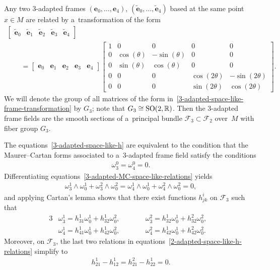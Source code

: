 \documentclass[10pt,a4paper]{amsart}
\numberwithin{equation}{section}
\theoremstyle{definition}
\begin{document}
Any two 3-adapted frames $(\mathbf{e}_0, \ldots, \mathbf{e}_4)$, $(\tilde{\mathbf{e}}_0, \ldots, \tilde{\mathbf{e}}_4)$
based at the same point $x \in M$ are related by a~transformation of the form
\begin{gather}
\begin{bmatrix}
\tilde{\mathbf{e}}_0 & \tilde{\mathbf{e}}_1 & \tilde{\mathbf{e}}_2 & \tilde{\mathbf{e}}_3 & \tilde{\mathbf{e}}_4
\end{bmatrix}
\nonumber
\\
\qquad{}
=
\begin{bmatrix}
\mathbf{e}_0 & \mathbf{e}_1 & \mathbf{e}_2 & \mathbf{e}_3 & \mathbf{e}_4
\end{bmatrix}
\begin{bmatrix}
1 & 0 & 0 & 0 & 0
\\
0 & \cos(\theta) & -\sin(\theta) & 0 & 0
\\
0 & \sin(\theta) & \cos(\theta) & 0 & 0
\\
0 & 0 & 0 & \cos(2\theta) & -\sin(2\theta)
\\
0 & 0 & 0 & \sin(2\theta) & \cos(2\theta)
\end{bmatrix}.
\label{3-adapted-space-like-frame-transformation}
\end{gather}
We will denote the group of all matrices of the form in~\eqref{3-adapted-space-like-frame-transformation} by $G_3$; note
that $G_3 \cong {\rm SO}(2,\mathbb{R})$.
Then the 3-adapted frame f\/ields are the smooth sections of a~principal bundle $\mathcal{F}_3 \subset \mathcal{F}_2$
over~$M$ with f\/iber group $G_3$.

The equations~\eqref{3-adapted-space-like-h} are equivalent to the condition that the Maurer--Cartan forms associated to
a~3-adapted frame f\/ield satisfy the conditions
\begin{gather}
\omega^0_3 = \omega^0_4 = 0.
\label{3-adapted-MC-space-like-relations}
\end{gather}
Dif\/ferentiating equations~\eqref{3-adapted-MC-space-like-relations} yields
\begin{gather*}
\omega^1_3 \wedge \omega^1_0 + \omega^2_3 \wedge \omega^2_0 = \omega^1_4 \wedge \omega^1_0 + \omega^2_4 \wedge
\omega^2_0 = 0,
\end{gather*}
and applying Cartan's lemma shows that there exist functions $h^i_{jk}$ on $\mathcal{F}_3$ such that
\begin{alignat*}{3}
& \omega^1_3=h^1_{31}\omega^1_0 + h^1_{32}\omega^2_0,
\qquad&&
\omega^2_3=h^1_{32}\omega^1_0 + h^2_{32}\omega^2_0,&
\\
&\omega^1_4=h^1_{41}\omega^1_0 + h^1_{42}\omega^2_0,
\qquad&&
\omega^2_4=h^1_{42}\omega^1_0 + h^2_{42}\omega^2_0.&
\end{alignat*}
Moreover, on $\mathcal{F}_3$, the last two relations in equations~\eqref{2-adapted-space-like-h-relations} simplify to
\begin{gather*}
h^1_{21} - h^1_{12} = h^2_{21} - h^1_{22} = 0.
\end{gather*}
\end{document}
